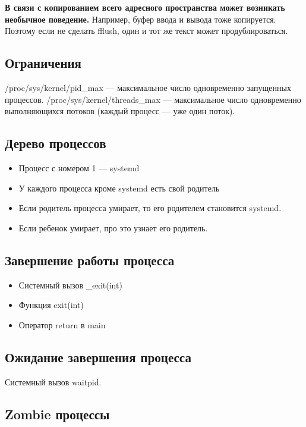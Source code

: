 \begin{multicols}{2}
    \textbf{В связи с копированием всего адресного пространства может возникать необычное поведение.} Например, 
    буфер ввода и вывода тоже копируется. Поэтому если не сделать fflush, один и тот
    же текст может продублироваться.
    
    \subsection*{Ограничения}
    
    /proc/sys/kernel/pid\_max --- максимальное число одновременно запущенных процессов.
    /proc/sys/kernel/threads\_max --- максимальное число одновременно 
    выполняющихся потоков (каждый процесс --- уже один поток).
    
    \subsection*{Дерево процессов}
    
    \begin{itemize}
      \item Процесс с номером 1 --- systemd
      \item У каждого процесса кроме systemd есть свой родитель
      \item Если родитель процесса умирает, то его родителем становится systemd.
      \item Если ребенок умирает, про это узнает его родитель. 
    \end{itemize}
    
    \subsection*{Завершение работы процесса}
    
    \begin{itemize}
      \item Системный вызов \_exit(int)
      \item Функция exit(int)
      \item Оператор return в main
    \end{itemize}
    
    \subsection*{Ожидание завершения процесса}
    
    Системный вызов waitpid.
    
    \subsection*{Zombie процессы}
    

\end{multicols}
